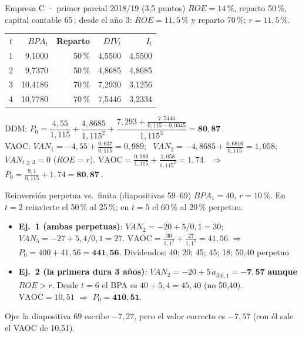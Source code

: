 \documentclass[10pt,a4paper,twoside]{article}
\newcommand{\an}[2]{a_{\overline{#1}|#2}}
\newcommand{\eur}{\,\text{€}}
\newcommand{\thead}[1]{\leavevmode\sffamily\bfseries\color{white}#1}
\newcommand{\headrow}{\rowcolor{steel}}
\begin{document}
\begin{ejemplo}{Empresa C · primer parcial 2018/19 (3,5 puntos)}
$ROE=14\,\%$, reparto 50\,\%, capital contable 65\eur; desde el año 3: $ROE=11,5\,\%$ y reparto 70\,\%; $r=11,5\,\%$.
\begin{center}\small
\begin{tabular}{@{}c r r r r@{}}
\headrow \thead{$t$} & \thead{$BPA_t$} & \thead{Reparto} & \thead{$DIV_t$} & \thead{$I_t$}\\
1 & 9,1000 & 50\,\% & 4,5500 & 4,5500\\
\rowcolor{mist}2 & 9,7370 & 50\,\% & 4,8685 & 4,8685\\
3 & 10,4186 & 70\,\% & 7,2930 & 3,1256\\
\rowcolor{mist}4 & 10,7780 & 70\,\% & 7,5446 & 3,2334\\
\end{tabular}
\end{center}
DDM: $P_0=\dfrac{4,55}{1,115}+\dfrac{4,8685}{1,115^2}+\dfrac{7,293+\frac{7,5446}{0,115-0,0345}}{1,115^3}=\mathbf{80,87}$\eur.\\
VAOC: $VAN_1=-4,55+\frac{0,637}{0,115}=0,989$; \ $VAN_2=-4,8685+\frac{0,6816}{0,115}=1,058$; \ $VAN_{t\geq3}=0$ ($ROE=r$).
$\text{VAOC}=\frac{0,989}{1,115}+\frac{1,058}{1,115^2}=1,74$ \ $\Rightarrow$ \ $P_0=\frac{9,1}{0,115}+1,74=\mathbf{80,87}$\eur.
\end{ejemplo}

\begin{ejemplo}{Reinversión perpetua vs.~finita (diapositivas 59–69)}
$BPA_1=40$, $r=10\,\%$. En $t=2$ reinvierte el 50\,\% al 25\,\%; en $t=5$ el 60\,\% al 20\,\% perpetuo.
\begin{itemize}
  \item \textbf{Ej.~1 (ambas perpetuas)}: $VAN_2=-20+5/0,1=30$; $VAN_5=-27+5,4/0,1=27$.
        $\text{VAOC}=\frac{30}{1,1^2}+\frac{27}{1,1^5}=41,56$ $\Rightarrow$ $P_0=400+41,56=\mathbf{441,56}$.
        Dividendos: 40; 20; 45; 45; 18; 50,40 perpetuo.
  \item \textbf{Ej.~2 (la primera dura 3 años)}: $VAN_2=-20+5\,\an{3}{0,1}=\mathbf{-7,57}$ \textbf{aunque $ROE>r$}.
        Desde $t=6$ el BPA es $40+5,4=45,40$ (no 50,40). $\text{VAOC}=10,51$ $\Rightarrow$ $P_0=\mathbf{410,51}$.
\end{itemize}
{\footnotesize\color{slate}Ojo: la diapositiva 69 escribe $-7,27$, pero el valor correcto es $-7,57$ (con él sale el VAOC de 10,51).}
\end{ejemplo}
\end{document}
